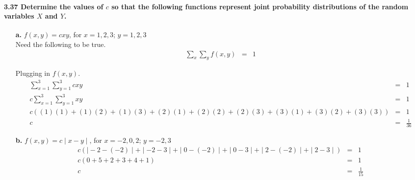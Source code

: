 \documentclass{article}
\begin{document}
\pagebreak

\paragraph{3.37 Determine the values of $c$ so that the following functions 
represent joint probability distributions of the random variables $X$ and 
$Y$.}
\begin{enumerate}
\item[\textbf{a.}] $f(x,y)=cxy$, for $x=1,2,3$; $y=1,2,3$\\
Need the following to be true.
\begin{eqnarray*}
\sum\limits_x \sum\limits_y f(x,y) & = & 1
\end{eqnarray*}

Plugging in $f(x,y)$.
\begin{eqnarray*}
\sum\limits_{x=1}^3 \sum\limits_{y=1}^3 cxy & = & 1\\
c \sum\limits_{x=1}^3 \sum\limits_{y=1}^3 xy & = & 1\\
c((1)(1)+(1)(2)+(1)(3)+(2)(1)+(2)(2)+(2)(3)+(3)(1)+(3)(2)+(3)(3)) & = & 1\\
c & = & \frac{1}{36}
\end{eqnarray*}

\item[\textbf{b.}] $f(x,y)=c\mid x-y\mid$, for $x=-2,0,2$; $y=-2,3$\\
\begin{eqnarray*}
c(\mid-2-(-2)\mid+\mid-2-3\mid+\mid0-(-2)\mid+\mid0-3\mid+\mid2-(-2)\mid+
	\mid2-3\mid) & = & 1\\
c(0+5+2+3+4+1) & = & 1\\
c & = & \frac{1}{15}
\end{eqnarray*}
\end{enumerate}
\end{document}
